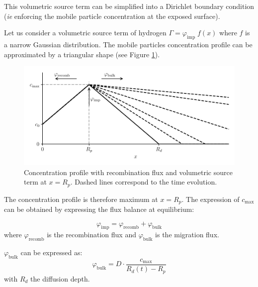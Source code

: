 This volumetric source term can be simplified into a Dirichlet boundary condition (\textit{ie} enforcing the mobile particle concentration at the exposed surface).

Let us consider a volumetric source term of hydrogen $\Gamma = \varphi_\mathrm{imp} \; f(x)$ where $f$ is a narrow Gaussian distribution.
The mobile particles concentration profile can be approximated by a triangular shape  (see Figure \ref{fig:recomb sketch}).

\begin{figure}[h!]
    \centering
    \includegraphics[width=0.75\linewidth]{Figures/Chapter2/recomb_sketch.pdf}
    \caption{Concentration profile with recombination flux and volumetric source term at $x=R_p$. Dashed lines correspond to the time evolution.}
    \label{fig:recomb sketch}
\end{figure}

The concentration profile is therefore maximum at $x=R_p$.
The expression of $c_\mathrm{max}$ can be obtained by expressing the flux balance at equilibrium:

\begin{equation}
    \varphi_\mathrm{imp} = \varphi_\mathrm{recomb} + \varphi_\mathrm{bulk}
    \label{eq:flux balance}
\end{equation}
where $\varphi_\mathrm{recomb}$ is the recombination flux and $\varphi_\mathrm{bulk}$ is the migration flux.

$\varphi_\mathrm{bulk}$ can be expressed as:
\begin{equation}
    \varphi_\mathrm{bulk} = D \cdot \frac{c_\mathrm{max}}{R_d(t) - R_p}
\end{equation}
with $R_d$ the diffusion depth.

